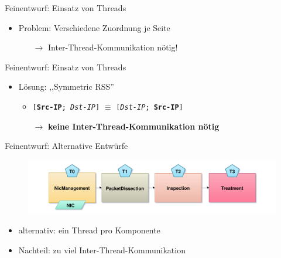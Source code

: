 \documentclass{beamer}
\begin{document}
\begin{frame}{Feinentwurf: Einsatz von Threads}
    \begin{itemize}
        \item Problem: Verschiedene Zuordnung je Seite
              \begin{itemize}
                  \item[\(\rightarrow\)] Inter-Thread-Kommunikation nötig!
              \end{itemize}
    \end{itemize}
    \begin{figure}
        \center
    \end{figure}
\end{frame}

\begin{frame}{Feinentwurf: Einsatz von Threads}
    \begin{itemize}
        \item Lösung: ,,Symmetric RSS''
              \begin{itemize}
                  \item \texttt{[\textbf{Src-IP}; \textit{Dst-IP}]} \(\equiv\) \texttt{[\textit{Dst-IP}; \textbf{Src-IP}]}
                  \item[\(\rightarrow\)] \textbf{keine Inter-Thread-Kommunikation nötig}
              \end{itemize}
    \end{itemize}
    \begin{figure}
        \center
    \end{figure}
\end{frame}

\begin{frame}{Feinentwurf: Alternative Entwürfe}
    \begin{figure}
        \center
        \includegraphics[width=\textwidth]{multithreading_old.pdf}
    \end{figure}
    \begin{itemize}
        \item alternativ: ein Thread pro Komponente
        \item Nachteil: zu viel Inter-Thread-Kommunikation
    \end{itemize}
\end{frame}
\end{document}
